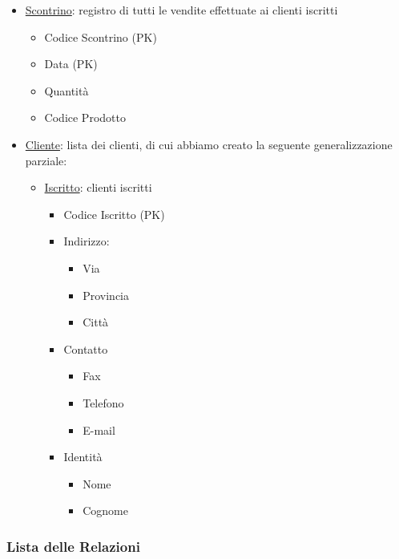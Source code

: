 \begin{itemize}
\item \underline{Scontrino}: registro di tutti le vendite effettuate ai clienti iscritti
  \begin{itemize}
  \item Codice Scontrino (PK)
  \item Data (PK)
  \item Quantit\`a
  \item Codice Prodotto
  \end{itemize}

\item \underline{Cliente}: lista dei clienti, di cui abbiamo creato la seguente generalizzazione parziale:
  \begin{itemize}
  \item \underline{Iscritto}: clienti iscritti
    \begin{itemize}
    \item Codice Iscritto (PK)
    \item Indirizzo:
      \begin{itemize}
      \item Via
      \item Provincia
      \item Citt\`a
      \end{itemize}

    \item Contatto
      \begin{itemize}
      \item Fax
      \item Telefono
      \item E-mail
      \end{itemize}

    \item Identit\`a
      \begin{itemize}
      \item Nome
      \item Cognome
      \end{itemize}

    \end{itemize}
  \end{itemize}
  
\end{itemize}


\subsubsection{Lista delle Relazioni}

